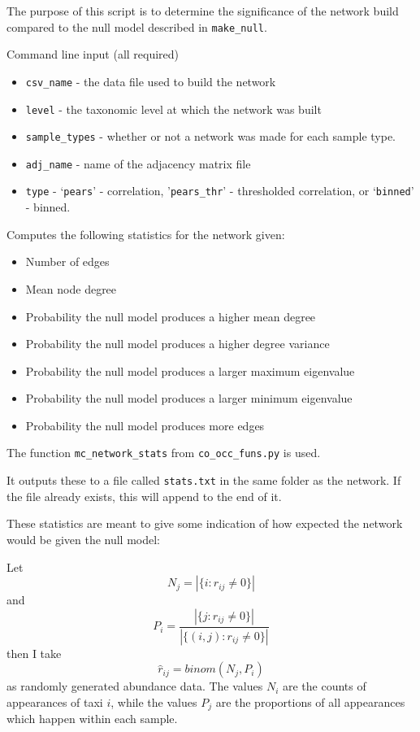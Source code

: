 \documentclass[10pt]{article}
\theoremstyle{definition}
\numberwithin{theorem}{section}
\numberwithin{definition}{section}
\numberwithin{lemma}{section}
\numberwithin{corollary}{section}
\numberwithin{clm}{section}
\numberwithin{rmk}{section}
\begin{document}
The purpose of this script is to determine the significance of the network build compared to the null model described in \verb|make_null|. 

Command line input (all required)
\begin{itemize}
	\item \verb|csv_name| - the data file used to build the network
	\item \verb|level| - the taxonomic level at which the network was built
	\item \verb|sample_types| - whether or not a network was made for each sample type.
	\item \verb|adj_name| - name of the adjacency matrix file
	\item \verb|type| - `\verb|pears|' - correlation, '\verb|pears_thr|' -  thresholded correlation, or `\verb|binned|' - binned.
\end{itemize}

Computes the following statistics for the network given:
\begin{itemize}
	\item Number of edges
	\item Mean node degree
	\item Probability the null model produces a higher mean degree
	\item Probability the null model produces a higher degree variance
	\item Probability the null model produces a larger maximum eigenvalue
	\item Probability the null model produces a larger minimum eigenvalue
	\item Probability the null model produces more edges
\end{itemize}
The function \verb|mc_network_stats| from \verb|co_occ_funs.py| is used.

It outputs these to a file called \verb|stats.txt| in the same folder as the network. If the file already exists, this will append to the end of it.

These statistics are meant to give some indication of how expected the network would be given the null model:

Let 
\[
N_j = |\{i: r_{ij} \neq 0\}|
\]
and 
\[
P_i = \frac{|\{j: r_{ij}\neq 0 \}|}{|\{(i,j): r_{ij}\neq 0 \}|}
\]
then I take 
\[
\hat{r}_{ij} = \mathit{binom}(N_j,P_i)
\]
as randomly generated abundance data. The values $N_i$ are the counts of appearances of taxi $i$, while the values $P_j$ are the proportions of all appearances which happen within each sample. 
\end{document}
